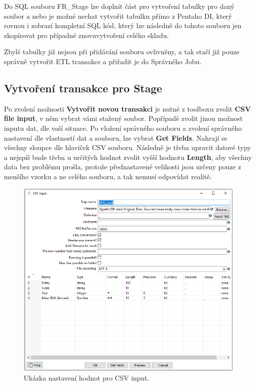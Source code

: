 \documentclass[thesis=M,czech]{FITthesis}[2022/10/08]
\begin{document}
Do SQL souboru FR\_Stage lze doplnit část pro vytvoření tabulky pro daný soubor a nebo je možné nechat vytvořit tabulku přímo z Pentaho DI, který rovnou i zobrazí kompletní SQL kód, který lze následně do tohoto souboru jen zkopírovat pro případné znovuvytvoření celého skladu.

Zbylé tabulky již nejsou při přidávání souboru ovlivněny, a tak stačí již pouze správně vytvořit ETL transakce a přiřadit je do Správného Jobu. 

\subsection{Vytvoření transakce pro Stage}
Po zvolení možnosti \textbf{Vytvořit novou transakci} je nutné z toolboxu zvolit \textbf{CSV file input}, v něm vybrat vámi stažený soubor. Popřípadě zvolit jinou možnost inputu dat, dle vaší situace.
Po vložení správného souboru a zvolení správného nastavení dle vlastností dat a souboru, lze vybrat \textbf{Get Fields}. Nahrají se všechny sloupce dle hlaviček CSV souboru. Následně je třeba upravit datové typy  a nejspíš bude třeba u určitých hodnot zvolit vyšší hodnotu \textbf{Length}, aby všechny data bez problému prošla, protože přednastavené velikosti jsou určeny pouze z menšího vzorku a ne celého souboru, a tak nemusí odpovídat realitě.

\begin{figure}
    \centering
    \includegraphics[width=\textwidth]{DP-obrazky/CSV_input.png}
    \caption{Ukázka nastavení hodnot pro CSV input.}
    \label{fig:CSV_input}
\end{figure}
\end{document}
